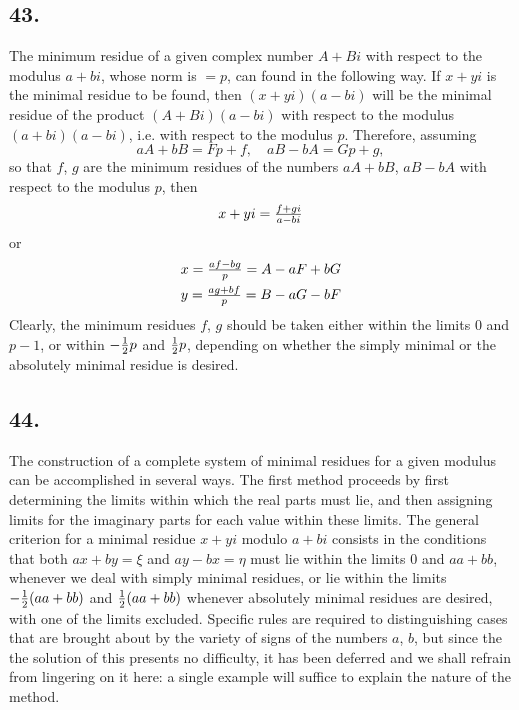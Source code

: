\documentclass[twoside,12pt]{memoir}
\let\oldfrac\frac
\def\frac#1#2{\mathchoice{\tfrac{#1}{#2}}{\oldfrac{#1}{#2}}{\genfrac{}{}{}{2}{#1}{#2\mathstrut}}{\genfrac{}{}{}{3}{#1}{#2\mathstrut}}}
\begin{document}
\subsection*{43.}

The minimum residue of a given complex number \(A+Bi\) with respect to the modulus \(a+bi\), whose norm is \(=p\), can found in the following way. If \(x+yi\) is the minimal residue to be found, then \((x+yi)(a-bi)\) will be the minimal residue of the product \((A+Bi)(a-bi)\) with respect to the modulus \((a+bi)(a-bi)\), i{.}e{.} with respect to the modulus \(p\). Therefore, assuming
\[a A+ b B = F p + f, \quad a B - b A = G p + g,\]
so that \(f\), \(g\) are the minimum residues of the numbers \(aA + bB\), \(aB - bA\) with respect to the modulus \(p\), then\pagebreak%
\[x+yi=\frac{f+gi}{a-bi}\]
or
\[\begin{aligned}
& x=\frac{af-bg}{p}=A-aF+bG \\
& y=\frac{ag+bf}{p}=B-aG-bF
\end{aligned}\]
Clearly, the minimum residues \(f\), \(g\) should be taken either within the limits \(0\) and \(p-1\), or within \(-\frac{1}{2}p\) and \(\frac{1}{2}p\), depending on whether the simply minimal or the absolutely minimal residue is desired.

\subsection*{44.}

The construction of a complete system of minimal residues for a given modulus can be accomplished in several ways. The first method proceeds by first determining the limits within which the real parts must lie, and then assigning limits for the imaginary parts for each value within these limits. The general criterion for a minimal residue \(x+yi\) modulo \(a+bi\) consists in the conditions that both \(ax+by=\xi\) and \(ay-bx=\eta\) must lie within the limits \(0\) and \(aa+bb\), whenever we deal with simply minimal residues, or lie within the limits \(-\frac{1}{2}(aa+bb)\) and \(\frac{1}{2}(aa+bb)\) whenever absolutely minimal residues are desired, with one of the limits excluded. Specific rules are required to distinguishing cases that are brought about by the variety of signs of the numbers \(a\), \(b\), but since the the solution of this presents no difficulty, it has been deferred and we shall refrain from lingering on it here: a single example will suffice to explain the nature of the method. 
\end{document}
